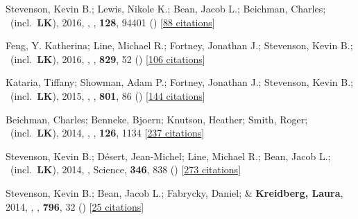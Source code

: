 \item[{\color{numcolor}\scriptsize9}] Stevenson, Kevin B.; Lewis, Nikole K.; Bean, Jacob L.; Beichman, Charles; \etal\ (incl.\ \textbf{LK}), 2016, , \pasp, \textbf{128}, 94401 () [\href{https://ui.adsabs.harvard.edu/abs/2016PASP..128i4401S}{88 citations}]

\item[{\color{numcolor}\scriptsize8}] Feng, Y. Katherina; Line, Michael R.; Fortney, Jonathan J.; Stevenson, Kevin B.; \etal\ (incl.\ \textbf{LK}), 2016, , \apj, \textbf{829}, 52 () [\href{https://ui.adsabs.harvard.edu/abs/2016ApJ...829...52F}{106 citations}]

\item[{\color{numcolor}\scriptsize7}] Kataria, Tiffany; Showman, Adam P.; Fortney, Jonathan J.; Stevenson, Kevin B.; \etal\ (incl.\ \textbf{LK}), 2015, , \apj, \textbf{801}, 86 () [\href{https://ui.adsabs.harvard.edu/abs/2015ApJ...801...86K}{144 citations}]

\item[{\color{numcolor}\scriptsize6}] Beichman, Charles; Benneke, Bjoern; Knutson, Heather; Smith, Roger; \etal\ (incl.\ \textbf{LK}), 2014, , \pasp, \textbf{126}, 1134 [\href{https://ui.adsabs.harvard.edu/abs/2014PASP..126.1134B}{237 citations}]

\item[{\color{numcolor}\scriptsize5}] Stevenson, Kevin B.; D{\'e}sert, Jean-Michel; Line, Michael R.; Bean, Jacob L.; \etal\ (incl.\ \textbf{LK}), 2014, , Science, \textbf{346}, 838 () [\href{https://ui.adsabs.harvard.edu/abs/2014Sci...346..838S}{273 citations}]

\item[{\color{numcolor}\scriptsize4}] Stevenson, Kevin B.; Bean, Jacob L.; Fabrycky, Daniel; \& \textbf{Kreidberg, Laura}, 2014, , \apj, \textbf{796}, 32 () [\href{https://ui.adsabs.harvard.edu/abs/2014ApJ...796...32S}{25 citations}]

